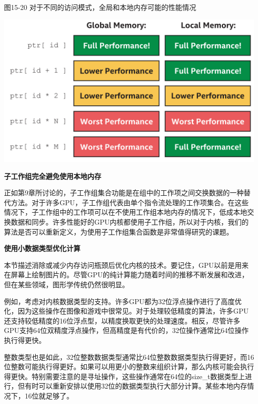 \hspace*{\fill} \par %
图15-20 对于不同的访问模式，全局和本地内存可能的性能情况
\begin{center}
	\includegraphics[width=1.0\textwidth]{content/chapter-15/images/15}
\end{center}

\hspace*{\fill} \par %
\textbf{子工作组完全避免使用本地内存}

正如第9章所讨论的，子工作组集合功能是在组中的工作项之间交换数据的一种替代方法。对于许多GPU，子工作组代表由单个指令流处理的工作项集合。在这些情况下，子工作组中的工作项可以在不使用工作组本地内存的情况下，低成本地交换数据和同步。许多性能好的GPU内核都使用子工作组，所以对于内核，我们的算法是否可以重新定义，为使用子工作组集合函数是非常值得研究的课题。\par

\hspace*{\fill} \par %
\textbf{使用小数据类型优化计算}

本节描述消除或减少内存访问瓶颈后优化内核的技术。要记住，GPU以前是用来在屏幕上绘制图片的。尽管GPU的纯计算能力随着时间的推移不断发展和改进，但在某些领域，图形学传统仍然很明显。\par

例如，考虑对内核数据类型的支持。许多GPU都为32位浮点操作进行了高度优化，因为这些操作在图像和游戏中很常见。对于处理较低精度的算法，许多GPU还支持较低精度的16位浮点型，以精度换取更快的处理速度。相反，尽管许多GPU支持64位双精度浮点操作，但高精度是有代价的，32位操作通常比64位操作执行得更快。\par

整数类型也是如此，32位整数数据类型通常比64位整数数据类型执行得更好，而16位整数可能执行得更好。如果可以用更小的整数来组织计算，那么内核可能会执行得更快。特别需要注意的是寻址操作，这些操作通常在64位的size\_t数据类型上进行，但有时可以重新安排以使用32位的数据类型执行大部分计算。某些本地内存情况下，16位就足够了。\par

